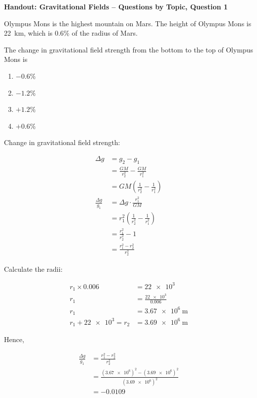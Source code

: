 \noindent\textbf{Handout: Gravitational Fields -- Questions by Topic, Question 1}

Olympus Mons is the highest mountain on Mars. The height of Olympus Mons is \SI{22}{\kilo\metre}, which is 0.6\% of the radius of Mars.

The change in gravitational field strength from the bottom to the top of Olympus Mons is

\begin{enumerate}[label=\textbf{\Alph*}]
  \item \( -0.6\% \)
  \item \( -1.2\% \)
  \item \( +1.2\% \)
  \item \( +0.6\% \)
\end{enumerate}

Change in gravitational field strength:

\begin{align*}
  \Delta g &= g_2 - g_1 \\
  &= \frac{GM}{r_2^2} - \frac{GM}{r_1^2} \\
  &= GM\left(\frac 1 {r_2^2} - \frac 1 {r_1^2}\right) \\
  \frac{\Delta g}{g_1} &= \Delta g \cdot \frac{r_1^2}{GM} \\
  &= r_1^2\left(\frac 1 {r_2^2} - \frac 1 {r_1^2}\right) \\
  &= \frac{r_1^2}{r_2^2} - 1 \\
  &= \frac{r_1^2 - r_2^2}{r_2^2}
\end{align*}

Calculate the radii:

\begin{align*}
  r_1 \times 0.006 &= \num{22e3} \\
  r_1 &= \frac{\num{22e3}}{0.006} \\
  r_1 &= \SI{3.67e6}{\metre} \\
  r_1 + \num{22e3} = r_2 &= \SI{3.69e6}{\metre}
\end{align*}

Hence,

\begin{align*}
  \frac{\Delta g}{g_1} &= \frac{r_1^2 - r_2^2}{r_2^2} \\
  &= \frac{{(\num{3.67e6})}^2 - {(\num{3.69e6})}^2}{{(\num{3.69e6})}^2} \\
  &= -0.0109
\end{align*}
